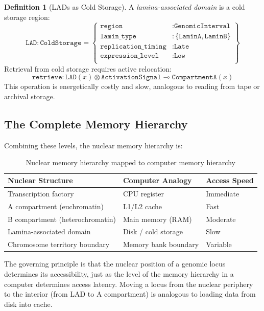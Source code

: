 \documentclass[12pt,a4paper]{article}
\theoremstyle{plain}
\theoremstyle{definition}
\newtheorem{definition}[theorem]{Definition}
\begin{document}
\begin{definition}[LADs as Cold Storage]\label{def:lads}
A \emph{lamina-associated domain} is a cold storage region:
\[
  \texttt{LAD} : \texttt{ColdStorage} = \left\{
    \begin{array}{ll}
      \texttt{region} &: \texttt{GenomicInterval} \\
      \texttt{lamin\_type} &: \{\texttt{LaminA}, \texttt{LaminB}\} \\
      \texttt{replication\_timing} &: \texttt{Late} \\
      \texttt{expression\_level} &: \texttt{Low} \\
    \end{array}
  \right\}
\]
Retrieval from cold storage requires active relocation:
\[
  \texttt{retrieve} : \texttt{LAD}(x) \otimes \texttt{ActivationSignal} \multimap \texttt{CompartmentA}(x)
\]
This operation is energetically costly and slow, analogous to reading from tape or archival storage.
\end{definition}

\subsection{The Complete Memory Hierarchy}

Combining these levels, the nuclear memory hierarchy is:

\begin{table}[H]
\centering
\caption{Nuclear memory hierarchy mapped to computer memory hierarchy}
\begin{tabular}{@{}lll@{}}
\toprule
\textbf{Nuclear Structure} & \textbf{Computer Analogy} & \textbf{Access Speed} \\
\midrule
Transcription factory & CPU register & Immediate \\
A compartment (euchromatin) & L1/L2 cache & Fast \\
B compartment (heterochromatin) & Main memory (RAM) & Moderate \\
Lamina-associated domain & Disk / cold storage & Slow \\
Chromosome territory boundary & Memory bank boundary & Variable \\
\bottomrule
\end{tabular}
\label{tab:hierarchy}
\end{table}

The governing principle is that the nuclear position of a genomic locus determines its accessibility, just as the level of the memory hierarchy in a computer determines access latency. Moving a locus from the nuclear periphery to the interior (from LAD to A compartment) is analogous to loading data from disk into cache.
\end{document}
